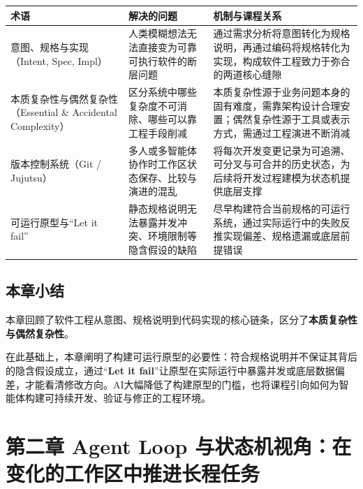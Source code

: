 \documentclass[UTF8,a4paper,11pt,fontset=fandol]{ctexart}
\begin{document}
\begin{center}\small\begin{tabularx}{\linewidth}{YYY}

\toprule

术语 & 解决的问题 & 机制与课程关系\\\midrule

意图、规格与实现（Intent, Spec, Impl） & 人类模糊想法无法直接变为可靠可执行软件的断层问题 & 通过需求分析将意图转化为规格说明，再通过编码将规格转化为实现，构成软件工程致力于弥合的两道核心缝隙\\[3pt]

本质复杂性与偶然复杂性（Essential \& Accidental Complexity） & 区分系统中哪些复杂度不可消除、哪些可以靠工程手段削减 & 本质复杂性源于业务问题本身的固有难度，需靠架构设计合理安置；偶然复杂性源于工具或表示方式，需通过工程演进不断消减\\[3pt]

版本控制系统（Git / Jujutsu） & 多人或多智能体协作时工作区状态保存、比较与演进的混乱 & 将每次开发变更记录为可追溯、可分叉与可合并的历史状态，为后续将开发过程建模为状态机提供底层支撑\\[3pt]

可运行原型与“Let it fail” & 静态规格说明无法暴露并发冲突、环境限制等隐含假设的缺陷 & 尽早构建符合当前规格的可运行系统，通过实际运行中的失败反推实现偏差、规格遗漏或底层前提错误\\[3pt]

\bottomrule\end{tabularx}\end{center}

\subsection{本章小结}

本章回顾了软件工程从意图、规格说明到代码实现的核心链条，区分了\textbf{本质复杂性与偶然复杂性}。

在此基础上，本章阐明了构建可运行原型的必要性：符合规格说明并不保证其背后的隐含假设成立，通过“\textbf{Let it fail}”让原型在实际运行中暴露并发或底层数据偏差，才能看清修改方向。AI大幅降低了构建原型的门槛，也将课程引向如何为智能体构建可持续开发、验证与修正的工程环境。

\section{第二章 Agent Loop 与状态机视角：在变化的工作区中推进长程任务}
\end{document}
